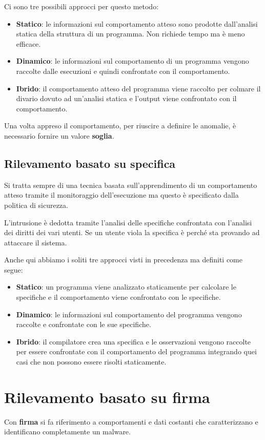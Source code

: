 Ci sono tre possibili approcci per questo metodo:
\begin{itemize}
	\item \textbf{Statico}: le informazioni sul comportamento atteso sono prodotte dall'analisi statica della
	      struttura di un programma. Non richiede tempo ma è meno efficace.
	\item \textbf{Dinamico}: le informazioni sul comportamento di un programma vengono raccolte dalle esecuzioni e
	      quindi confrontate con il comportamento.
	\item \textbf{Ibrido}: il comportamento atteso del programma viene raccolto per colmare il divario dovuto ad
	      un'analisi statica e l'output viene confrontato con il comportamento.
\end{itemize}
Una volta appreso il comportamento, per riuscire a definire le anomalie, è necessario fornire un valore
\textbf{soglia}.

\subsection{Rilevamento basato su specifica}
Si tratta sempre di una tecnica basata sull'apprendimento di un comportamento atteso tramite il monitoraggio
dell'esecuzione ma questo è specificato dalla politica di sicurezza.

L'intrusione è dedotta tramite l'analisi delle specifiche confrontata con l'analisi dei diritti dei vari utenti. Se
un utente viola la specifica è perché sta provando ad attaccare il sistema.

Anche qui abbiamo i soliti tre approcci visti in precedenza ma definiti come segue:
\begin{itemize}
	\item \textbf{Statico}: un programma viene analizzato staticamente per calcolare le specifiche e il comportamento
	      viene confrontato con le specifiche.
	\item \textbf{Dinamico}: le informazioni sul comportamento del programma vengono raccolte e confrontate con le sue
	      specifiche.
	\item \textbf{Ibrido}: il compilatore crea una specifica e le osservazioni vengono raccolte per essere confrontate
	      con il comportamento del programma integrando quei casi che non possono essere risolti staticamente.
\end{itemize}

\section{Rilevamento basato su firma}
Con \textbf{firma} si fa riferimento a comportamenti e dati costanti che caratterizzano e identificano completamente
un malware.

